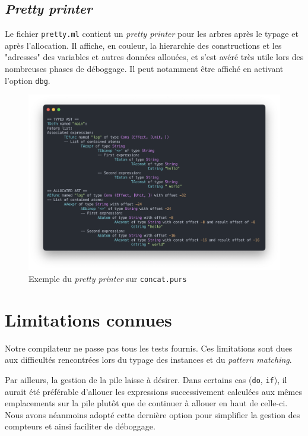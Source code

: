 \documentclass[12pt,a4paper]{article}
\begin{document}
\subsection{\emph{Pretty printer}}
Le fichier \texttt{pretty.ml} contient un \emph{pretty printer} pour les arbres après le typage et après l'allocation. Il affiche, en couleur, la hierarchie des constructions et les "adresses" des variables et autres données allouées, et s'est avéré très utile lors des nombreuses phases de déboggage. Il peut notamment être affiché en activant l'option \texttt{\textendash \textendash dbg}.

\begin{figure}[!h]
    \center
    \includegraphics[scale=0.45]{pretty_printer.png}
    \caption{Exemple du \emph{pretty printer} sur \texttt{concat.purs}}
\end{figure}

\section{Limitations connues}
Notre compilateur ne passe pas tous les tests fournis. Ces limitations sont dues aux difficultés rencontrées lors du typage des instances et du \emph{pattern matching}.

Par ailleurs, la gestion de la pile laisse à désirer. Dans certains cas (\texttt{do}, \texttt{if}), il aurait été préférable d'allouer les expressions successivement calculées aux mêmes emplacements sur la pile plutôt que de continuer à allouer en haut de celle-ci. Nous avons néanmoins adopté cette dernière option pour simplifier la gestion des compteurs et ainsi faciliter de déboggage.
\end{document}
